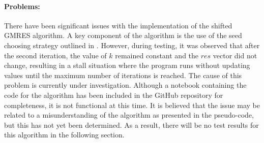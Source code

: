 \paragraph{Problems:} There have been significant issues with the implementation of the shifted GMRES algorithm. A key component of the algorithm is the use of the seed choosing strategy outlined in \cite{SHEN2022126799}. However, during testing, it was observed that after the second iteration, the value of $k$ remained constant and the $res$ vector did not change, resulting in a stall situation where the program runs without updating values until the maximum number of iterations is reached. The cause of this problem is currently under investigation. Although a notebook containing the code for the algorithm has been included in the GitHub repository for completeness, it is not functional at this time. It is believed that the issue may be related to a misunderstanding of the algorithm as presented in the pseudo-code, but this has not yet been determined. As a result, there will be no test results for this algorithm in the following section.


